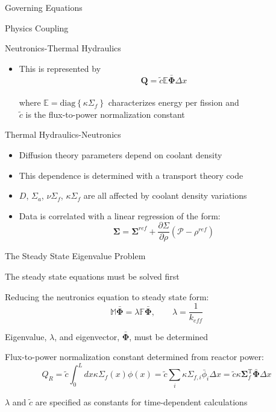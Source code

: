 \documentclass{beamer}
\begin{document}
\begin{section}{Governing Equations}
\begin{frame}{Physics Coupling}
\begin{block}{Neutronics-Thermal Hydraulics}
\begin{itemize}
    \item This is represented by
    \[
      \mathbf{Q}=\tilde{c}\mathbb{E}\bar{\mathbf{\Phi}}\Delta x
    \]
    \\where $\mathbb{E}=\mathrm{diag}\left\{\kappa\Sigma_{f}\right\}$ characterizes energy per fission and \\  $\tilde{c}$ is the flux-to-power normalization constant
  \end{itemize}
\end{block}
\begin{alertblock}{Thermal Hydraulics-Neutronics}
  \begin{itemize}
    \item Diffusion theory parameters depend on coolant density
    \item This dependence is determined with a transport theory code
    \item $D$, $\Sigma_{a}$, $\nu\Sigma_{f}$, $\kappa\Sigma_{f}$ are all affected by coolant density variations
    \item Data is correlated with a linear regression of the form:
    \[
     \mathbf{\Sigma} = \mathbf{\Sigma}^{ref} + \frac{\partial\Sigma}{\partial\rho}\left(\mathcal{P} - \rho^{ref}\right)
    \]
  \end{itemize}
\end{alertblock}
\end{frame}
\begin{frame}{The Steady State Eigenvalue Problem}
\begin{customlist}{2ex}{0pt}
  \item The steady state equations must be solved first
  \vfill\item Reducing the neutronics equation to steady state form:
  \[
    \mathbb{M}\bar{\mathbf{\Phi}}=\lambda\mathbb{F}\bar{\mathbf{\Phi}},\qquad \lambda = \frac{1}{k_{e\!f\!f}}
  \]
  \vfill\item Eigenvalue, $\lambda$, and eigenvector, $\bar{\mathbf{\Phi}}$, must be determined
  \vfill\item Flux-to-power normalization constant determined from reactor power:
  \[
    Q_{R}=\tilde{c}\int_{0}^{L}dx\kappa\Sigma_{f}\left(x\right)\phi\left(x\right)=\tilde{c}\sum_{i}\kappa\Sigma_{f,i}\bar{\phi}_{i}\Delta x=\tilde{c}\kappa\mathbf{\Sigma}_{f}^{\mathrm{T}}\bar{\mathbf{\Phi}}\Delta x
  \]
  \item $\lambda$ and $\tilde{c}$ are specified as constants for time-dependent calculations 
  \vspace{0.5cm}
\end{customlist}
\end{frame}
\end{section}
\end{document}
